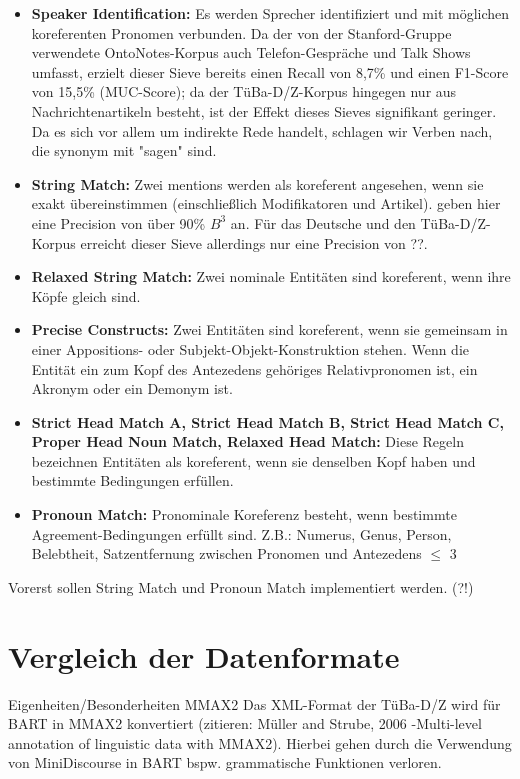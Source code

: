 \documentclass{scrartcl}
\begin{document}
\begin{itemize}
\item \textbf{Speaker Identification:} Es werden Sprecher identifiziert und mit m\"oglichen koreferenten Pronomen verbunden. Da der von der Stanford-Gruppe verwendete OntoNotes-Korpus auch Telefon-Gespräche und Talk Shows umfasst, erzielt dieser Sieve bereits einen Recall von 8,7\% und einen F1-Score von 15,5\% (MUC-Score); da der TüBa-D/Z-Korpus hingegen nur aus Nachrichtenartikeln besteht, ist der Effekt dieses Sieves signifikant geringer. Da es sich vor allem um indirekte Rede handelt, schlagen wir Verben nach, die synonym mit "sagen" sind.

\item \textbf{String Match:} Zwei mentions werden als koreferent angesehen, wenn sie exakt übereinstimmen (einschließlich Modifikatoren und Artikel).  geben hier eine Precision von über 90\% $B^3$ an. Für das Deutsche und den TüBa-D/Z-Korpus erreicht dieser Sieve allerdings nur eine Precision von ??.
\item \textbf{Relaxed String Match:} Zwei nominale Entit\"aten sind koreferent, wenn ihre K\"opfe gleich sind.
\item \textbf{Precise Constructs:} Zwei Entit\"aten sind koreferent, wenn sie gemeinsam in einer Appositions- oder Subjekt-Objekt-Konstruktion stehen. Wenn die Entit\"at ein zum Kopf des Antezedens geh\"origes Relativpronomen ist, ein Akronym oder ein Demonym ist. 
\item \textbf{Strict Head Match A, Strict Head Match B, Strict Head Match C, Proper Head Noun Match, Relaxed Head Match:} Diese Regeln bezeichnen Entit\"aten als koreferent, wenn sie denselben Kopf haben und bestimmte Bedingungen erf\"ullen. 
\item \textbf{Pronoun Match:} Pronominale Koreferenz besteht, wenn bestimmte Agreement-Bedingungen erf\"ullt sind. Z.B.: Numerus, Genus, Person, Belebtheit, Satzentfernung zwischen Pronomen und Antezedens ${\leq}$ 3
\end{itemize}

Vorerst sollen String Match und Pronoun Match implementiert werden. (?!)


\section{Vergleich der Datenformate}
Eigenheiten/Besonderheiten MMAX2
Das XML-Format der TüBa-D/Z wird für BART in MMAX2 konvertiert (zitieren: Müller and Strube, 2006 -Multi-level annotation of linguistic data with MMAX2).
Hierbei gehen durch die Verwendung von MiniDiscourse in BART bspw. grammatische Funktionen verloren.
\end{document}
